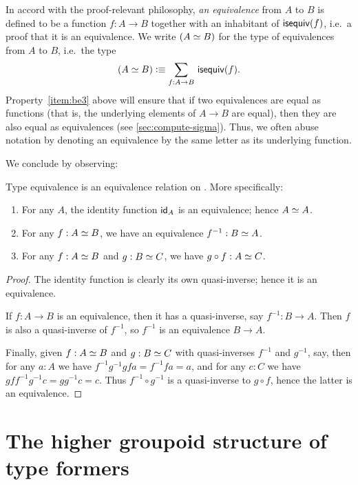 In accord with the proof-relevant philosophy,
%
\emph{an equivalence} from $A$ to $B$ is defined to be a function $f:A\to B$ together with an inhabitant of $\isequiv (f)$, i.e.\ a proof that it is an equivalence.
We write $(\eqv A B)$ for the type of equivalences from $A$ to $B$, i.e.\ the type
\begin{equation}\label{eq:eqv}
  (\eqv A B) \defeq \sm{f:A\to B} \isequiv(f).
\end{equation}
Property~\ref{item:be3} above will ensure that if two equivalences are equal as functions (that is, the underlying elements of $A\to B$ are equal), then they are also equal as equivalences (see \autoref{sec:compute-sigma}).
Thus, we often abuse notation by denoting an equivalence by the same letter as its underlying function.

We conclude by observing:

\begin{lem}\label{thm:equiv-eqrel}
  Type equivalence is an equivalence relation on \type.
  More specifically:
  \begin{enumerate}
  \item For any $A$, the identity function $\idfunc[A]$ is an equivalence; hence $\eqv A A$.
  \item For any $f:\eqv A B$, we have an equivalence $f^{-1} : \eqv B A$.
  \item For any $f:\eqv A B$ and $g:\eqv B C$, we have $g\circ f : \eqv A C$.
  \end{enumerate}
\end{lem}
\begin{proof}
  The identity function is clearly its own quasi-inverse; hence it is an equivalence.

  If $f:A\to B$ is an equivalence, then it has a quasi-inverse, say $f^{-1}:B\to A$.
  Then $f$ is also a quasi-inverse of $f^{-1}$, so $f^{-1}$ is an equivalence $B\to A$.

  Finally, given $f:\eqv A B$ and $g:\eqv B C$ with quasi-inverses $f^{-1}$ and $g^{-1}$, say, then for any $a:A$ we have $f^{-1} g^{-1} g f a = f^{-1} f a = a$, and for any $c:C$ we have $g f f^{-1} g^{-1} c = g g^{-1} c = c$.
  Thus $f^{-1} \circ g^{-1}$ is a quasi-inverse to $g\circ f$, hence the latter is an equivalence.
\end{proof}

%


\section{The higher groupoid structure of type formers}
\label{sec:computational}

